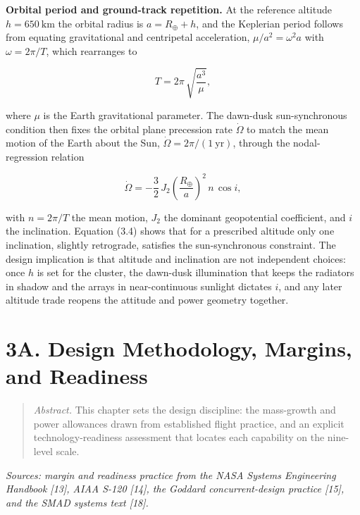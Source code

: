 \documentclass[
  11pt,
  openany,
  oneside]{book}
\begin{document}
\textbf{Orbital period and ground-track repetition.} At the reference
altitude \(h = 650\ \mathrm{km}\) the orbital radius is
\(a = R_{\oplus} + h\), and the Keplerian period follows from equating
gravitational and centripetal acceleration, \(\mu/a^{2} = \omega^{2} a\)
with \(\omega = 2\pi/T\), which rearranges to

\begin{equation}
T = 2\pi\,\sqrt{\frac{a^{3}}{\mu}}, \tag{3.3}
\end{equation}

where \(\mu\) is the Earth gravitational parameter. The dawn-dusk
sun-synchronous condition then fixes the orbital plane precession rate
\(\dot{\Omega}\) to match the mean motion of the Earth about the Sun,
\(\dot{\Omega} = 2\pi / (1\ \mathrm{yr})\), through the nodal-regression
relation

\begin{equation}
\dot{\Omega} = -\frac{3}{2}\,J_{2}\left(\frac{R_{\oplus}}{a}\right)^{2}\,n\,\cos i, \tag{3.4}
\end{equation}

with \(n = 2\pi/T\) the mean motion, \(J_{2}\) the dominant geopotential
coefficient, and \(i\) the inclination. Equation (3.4) shows that for a
prescribed altitude only one inclination, slightly retrograde, satisfies
the sun-synchronous constraint. The design implication is that altitude
and inclination are not independent choices: once \(h\) is set for the
cluster, the dawn-dusk illumination that keeps the radiators in shadow
and the arrays in near-continuous sunlight dictates \(i\), and any later
altitude trade reopens the attitude and power geometry together.

\chapter{3A. Design Methodology, Margins, and
Readiness}\label{a.-design-methodology-margins-and-readiness}

\begin{quote}
\emph{Abstract.} This chapter sets the design discipline: the
mass-growth and power allowances drawn from established flight practice,
and an explicit technology-readiness assessment that locates each
capability on the nine-level scale.
\end{quote}

\emph{Sources: margin and readiness practice from the NASA Systems
Engineering Handbook {[}13{]}, AIAA S-120 {[}14{]}, the Goddard
concurrent-design practice {[}15{]}, and the SMAD systems text
{[}18{]}.}
\end{document}
